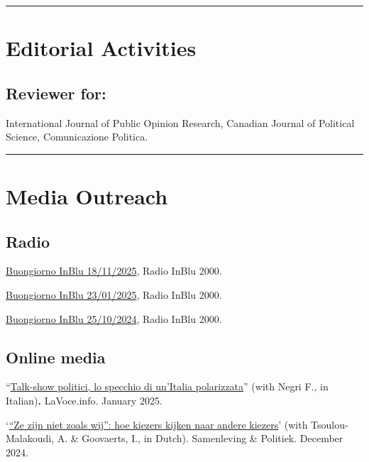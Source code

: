\documentclass[10pt,]{article}
\providecommand{\tightlist}{%
  \setlength{\itemsep}{0pt}\setlength{\parskip}{0pt}}
\renewenvironment{itemize}{
  \begin{list}{}{
    \setlength{\leftmargin}{1.5em}
  }
}{
  \end{list}
}
\begin{document}
\bigskip \hrule

\section{Editorial Activities}\label{editorial-activities}

\subsection{Reviewer for:}\label{reviewer-for}

International Journal of Public Opinion Research, Canadian Journal of
Political Science, Comunicazione Politica.

\bigskip \hrule

\section{Media Outreach}\label{media-outreach}

\subsection{Radio}\label{radio}

\begin{itemize}
\tightlist
\item
  \href{https://www.play2000.it/detail/140?episode_id=25289&season_id=908}{Buongiorno
  InBlu 18/11/2025}, Radio InBlu 2000.
\item
  \href{https://www.radioinblu.it/streaming/?vid=0_4i5p4bw4}{Buongiorno
  InBlu 23/01/2025}, Radio InBlu 2000.
\item
  \href{https://www.radioinblu.it/streaming/?vid=0_onrwcs4r}{Buongiorno
  InBlu 25/10/2024}, Radio InBlu 2000.
\end{itemize}

\subsection{Online media}\label{online-media}

\begin{itemize}
\tightlist
\item
  ``\href{https://lavoce.info/archives/106804/talk-show-politici-lo-specchio-di-unitalia-polarizzata/}{Talk-show
  politici, lo specchio di un'Italia polarizzata}'' (with Negri F., in
  Italian)\textbf{.} LaVoce.info. January 2025.
\end{itemize}

\begin{itemize}
\tightlist
\item
  `\href{https://www.sampol.be/2024/12/ze-zijn-niet-zoals-wij-hoe-kiezers-kijken-naar-andere-kiezers}{``Ze
  zijn niet zoals wij'': hoe kiezers kijken naar andere kiezers}' (with
  Tsoulou-Malakoudi, A. \& Goovaerts, I., in Dutch). Samenleving \&
  Politiek. December 2024.
\end{itemize}
\end{document}
